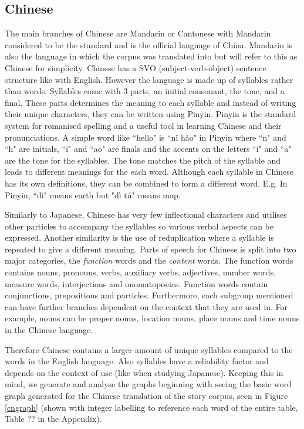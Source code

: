 \subsection{Chinese}
The main branches of Chinese are Mandarin or Cantonese with Mandarin considered to be the standard and is the official language of China. Mandarin is also the language in which the corpus was translated into but will refer to this as Chinese for simplicity. Chinese has a SVO (subject-verb-object) sentence structure like with English. However the language is made up of syllables \cite{ross2017modern} rather than words. Syllables come with 3 parts, an initial consonant, the tone, and a final. These parts determines the meaning to each syllable and instead of writing their unique characters, they can be written using Pinyin. Pinyin is the standard system for romanised spelling and a useful tool in learning Chinese and their pronunciations. A simple word like ``hello" is ``nǐ hǎo" in Pinyin where ``n" and ``h" are initials, ``i" and ``ao" are finals and the accents on the letters ``i" and ``a" are the tone for the syllables. The tone matches the pitch of the syllable and leads to different meanings for the each word. Although each syllable in Chinese has its own definitions, they can be combined to form a different word. E.g. In Pinyin, ``dì" means earth but "dì tú" means map.

Similarly to Japanese, Chinese has very few inflectional characters and utilises other particles to accompany the syllables so various verbal aspects can be expressed. Another similarity is the use of reduplication where a syllable is repeated to give a different meaning. Parts of speech for Chinese is split into two major categories, the \emph{function} words and the \emph{content} words. The function words contains nouns, pronouns, verbs, auxiliary verbs, adjectives, number words, measure words, interjections and onomatopoeias. Function words contain conjunctions, prepositions and particles. Furthermore, each subgroup mentioned can have further branches dependent on the context that they are used in. For example, nouns can be proper nouns, location nouns, place nouns and time nouns in the Chinese language.

Therefore Chinese contains a larger amount of unique syllables compared to the words in the English language. Also syllables have a reliability factor and depends on the context of use (like when studying Japanese). Keeping this in mind, we generate and analyse the graphs beginning with seeing the basic word graph generated for the Chinese translation of the story corpus, seen in Figure \ref{cngraph} (shown with integer labelling to reference each word of the entire table, Table ?? in the Appendix).

